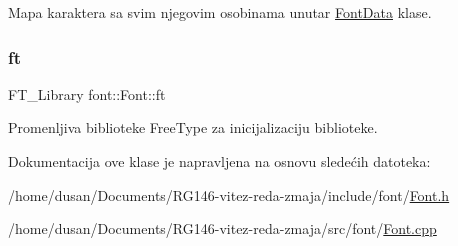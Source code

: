 Mapa karaktera sa svim njegovim osobinama unutar \hyperlink{classfont_1_1FontData}{Font\+Data} klase. 

\mbox{\label{classfont_1_1Font_a18b0337c00acccf27f72250100f2a1f1}} 
\subsubsection{\texorpdfstring{ft}{ft}}
{\footnotesize\ttfamily F\+T\+\_\+\+Library font\+::\+Font\+::ft\hspace{0.3cm}{\ttfamily [private]}}



Promenljiva biblioteke Free\+Type za inicijalizaciju biblioteke. 



Dokumentacija ove klase je napravljena na osnovu sledećih datoteka\+:\begin{DoxyCompactItemize}
\item 
/home/dusan/\+Documents/\+R\+G146-\/vitez-\/reda-\/zmaja/include/font/\hyperlink{Font_8h}{Font.\+h}\item 
/home/dusan/\+Documents/\+R\+G146-\/vitez-\/reda-\/zmaja/src/font/\hyperlink{Font_8cpp}{Font.\+cpp}\end{DoxyCompactItemize}
